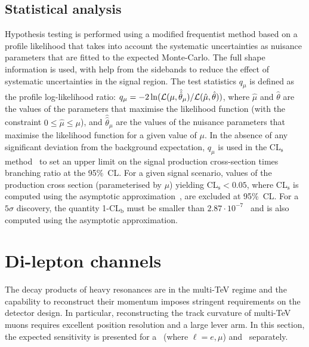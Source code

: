 \subsection{Statistical analysis}
Hypothesis testing is performed using a modified frequentist method based on a profile likelihood that takes into account the systematic uncertainties as nuisance parameters that are fitted to the expected Monte-Carlo. The full shape information is used, with help from the sidebands to reduce the effect of systematic uncertainties in the signal region. The test statistics $q_\mu$ is defined as the profile log-likelihood ratio: $q_\mu = -2\ln({\cal L}(\mu,\hat{\hat{\theta}}_\mu)/{\cal L}(\hat{\mu},\hat{\theta}))$, where $\hat{\mu}$ and $\hat{\theta}$ are the values of the parameters that maximise the likelihood function (with the constraint $0\leq \hat{\mu} \leq \mu$), and $\hat{\hat{\theta}}_\mu$ are the values of the nuisance parameters that maximise the likelihood function for a given value of $\mu$. In the absence of any significant deviation from the background expectation, $q_\mu$ is used in the CL$_\text{s}$ method~\cite{Junk:1999kv,Read:2002hq} to set an upper limit on the signal production cross-section times branching ratio at the 95\%~CL. For a given signal scenario, values of the production cross section (parameterised by $\mu$) yielding CL$_\text{s} < 0.05$, where CL$_\text{s}$ is computed using the asymptotic approximation~\cite{Cowan:2010js}, are excluded at 95\%~CL. For a $5\sigma$ discovery, the quantity 1-CL$_\text{b}$ must be smaller than $2.87 \cdot 10^{-7}$~\cite{Junk:1999kv} and is also computed using the asymptotic approximation.



\section{Di-lepton channels}
\label{sec:lep}

The decay products of heavy resonances are in the multi-TeV regime and the capability to reconstruct their momentum imposes stringent requirements on the detector design. In particular, reconstructing the track curvature of multi-TeV muons requires excellent position resolution and a large lever arm. In this section, the expected sensitivity is presented for a \Zpll\ (where $\ell=e,\mu$) and \Zptata\ separately.

